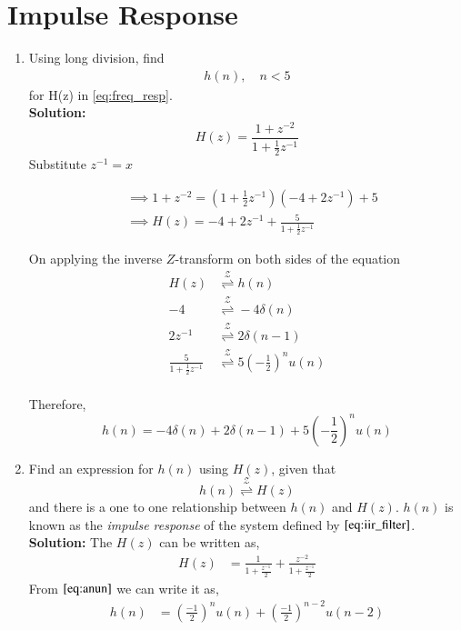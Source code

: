 \documentclass[journal,12pt,twocolumn]{IEEEtran}
\renewcommand\thesection{\arabic{section}}
\newcommand{\solution}{\noindent \textbf{Solution: }}
\providecommand{\brak}[1]{\ensuremath{\left(#1\right)}}
\providecommand{\ztrans}{\overset{\mathcal{Z}}{ \rightleftharpoons}}
\numberwithin{equation}{section}
\renewcommand\thesection{\arabic{section}}
\begin{document}
\section{Impulse Response}
\begin{enumerate}[label=\thesection.\arabic*]

\item Using long division, 
find
  \begin{align}
   h(n), \quad n < 5
  \end{align}
  for H(z) in 
  \eqref{eq:freq_resp}.\\
\solution 
 \begin{equation}
  H(z) = \frac{1 + z^{-2}}{1 + \frac12 z^{-1}}
 \end{equation}
 Substitute $z^{-1} = x$
 
 \begin{align}
  &\implies 1 + z^{-2} = \brak{1 + \frac12 z^{-1}}\brak{-4 + 2z^{-1}} + 5 \\
  &\implies H(z) = -4 + 2z^{-1} + \frac{5}{1 + \frac12 z^{-1}}
 \end{align}
 
 On applying the inverse $Z$-transform on both sides of the equation
 \begin{align}
  H(z) &\ztrans h(n) \\
  -4 &\ztrans -4\delta(n) \\
  2z^{-1} &\ztrans 2\delta(n - 1) \\
  \frac{5}{1 + \frac12 z^{-1}} &\ztrans 5\brak{-\frac12}^n u(n) \\
 \end{align}
 
 Therefore,
 \begin{equation}
  h(n) = -4\delta(n) + 2\delta(n - 1) + 5\brak{-\frac12}^n u(n)
 \end{equation}

\item Find an expression for $h(n)$ using $H(z)$, given that 
      \begin{equation}
        \label{eq:impulse_resp}
        h(n) \ztrans H(z)
      \end{equation}
      and there is a one to one relationship between $h(n)$ and $H(z)$. $h(n)$ is known as the {\em impulse response} of the system defined by $\eqref{eq:iir_filter}$.\\ 
    \solution The $H\brak{z}$ can be written as,
      \begin{align}
         H\brak{z} &= \frac{1}{1 + \frac{z^{-1}}{2}} + \frac{z^{-2}}{1+\frac{z^{-1}}{2}}
      \end{align}
      From $\eqref{eq:anun}$ we can write it as,
      \begin{align}
        h\brak{n} &= \brak{\frac{-1}{2}}^{n} u\brak{n} + \brak{\frac{-1}{2}}^{n-2} u\brak{n-2}\label{eq:hn}
      \end{align}
      

\end{enumerate}
\end{document}
